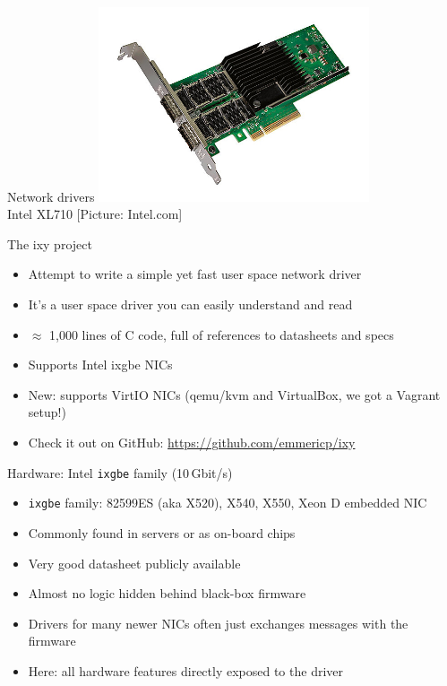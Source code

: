 \documentclass[NET,english,aspectratio=169,notitleframe]{tumbeamer}
\begin{document}
\begin{frame}{Network drivers}
\centering\includegraphics[width=0.60\textwidth]{pics/nic3}\\
\vspace{-1em}\tiny{Intel XL710 [Picture: Intel.com]}
\end{frame}

\begin{frame}{The ixy project}
\begin{itemize}
\item Attempt to write a simple yet fast user space network driver
\item It's a user space driver you can easily understand and read
\item $\approx$ 1,000 lines of C code, full of references to datasheets and specs
\item Supports Intel ixgbe NICs %
\item New: supports VirtIO NICs (qemu/kvm and VirtualBox, we got a Vagrant setup!)
\item Check it out on GitHub: \url{https://github.com/emmericp/ixy}
\end{itemize}
\end{frame}

\begin{frame}{Hardware: Intel \texttt{ixgbe} family (10\,Gbit/s)}
\begin{itemize}
\item \texttt{ixgbe} family: 82599ES (aka X520), X540, X550, Xeon D embedded NIC
\item Commonly found in servers or as on-board chips
\item Very good datasheet publicly available
\vspace{1em}
\item Almost no logic hidden behind black-box firmware
\item<2-> Drivers for many newer NICs often just exchanges messages with the firmware
\item<2-> Here: all hardware features directly exposed to the driver
\end{itemize}
\end{frame}
\end{document}
